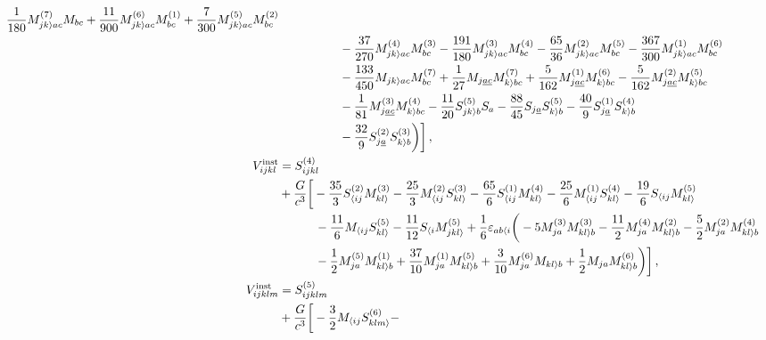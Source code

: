\documentclass[prd,preprint,superscriptaddress,tightenlines,nofootinbib,
  eqsecnum,showpacs]{revtex4}
\begin{document}
\begin{subequations}
\begin{align}
  \frac{1}{180} M_{jk \rangle ac}^{(7)} M_{bc} + \frac{11}{900} M_{jk
    \rangle ac}^{(6)} M_{bc}^{(1)} + \frac{7}{300} M_{jk \rangle
    ac}^{(5)} M_{bc}^{(2)} \nonumber \\ & \quad\qquad\qquad -
  \frac{37}{270} M_{jk \rangle ac}^{(4)} M_{bc}^{(3)} -
  \frac{191}{180} M_{jk \rangle ac}^{(3)} M_{bc}^{(4)} - \frac{65}{36}
  M_{jk \rangle ac}^{(2)} M_{bc}^{(5)} - \frac{367}{300} M_{jk \rangle
    ac}^{(1)} M_{bc}^{(6)} \nonumber \\ & \quad\qquad\qquad -
  \frac{133}{450} M_{jk \rangle ac} M_{bc}^{(7)} + \frac{1}{27} M_{j
    \underline{ac}} M_{k \rangle bc}^{(7)} + \frac{5}{162}
  M_{j\underline{ac}}^{(1)} M_{k \rangle bc}^{(6)} - \frac{5}{162}
  M_{j\underline{ac}}^{(2)} M_{k \rangle bc}^{(5)} \nonumber \\ &
  \nonumber \quad\qquad\qquad - \frac{1}{81} M_{j\underline{ac}}^{(3)}
  M_{k \rangle bc}^{(4)} - \frac{11}{20} S_{jk \rangle b}^{(5)} S_a -
  \frac{88}{45} S_{j \underline{a}} S_{k \rangle b}^{(5)} -
  \frac{40}{9} S_{j\underline{a}}^{(1)} S_{k \rangle b}^{(4)}
  \nonumber \\ & \nonumber \quad\qquad\qquad - \frac{32}{9}
  S_{j\underline{a}}^{(2)} S_{k \rangle b}^{(3)} \bigg)\bigg] \,,\\
V_{ijkl}^\text{inst} &= S^{(4)}_{ijkl} \nonumber \\ &+ {G\over
  c^3}\bigg[- {35\over3}S^{(2)}_{\langle
    ij}M^{(3)}_{kl\rangle}-{25\over3}M^{(2)}_{\langle
    ij}S^{(3)}_{kl\rangle} -{65\over6}S^{(1)}_{\langle
    ij}M^{(4)}_{kl\rangle}-{25\over6}M^{(1)}_{\langle
    ij}S^{(4)}_{kl\rangle} -{19\over6}S_{\langle
    ij}M^{(5)}_{kl\rangle}\nonumber\\ & \quad\qquad
  -{11\over6}M_{\langle ij}S^{(5)}_{kl\rangle}-{11\over12}S_{\langle
    i}M^{(5)}_{jkl\rangle} +{1\over6}\varepsilon_{ab\langle
    i}\bigg(-5M^{(3)}_{ja}M^{(3)}_{kl\rangle b}
  -{11\over2}M^{(4)}_{ja}M^{(2)}_{kl\rangle b}
  -{5\over2}M^{(2)}_{ja}M^{(4)}_{kl\rangle b}\nonumber\\ & \quad\qquad
  -{1\over2}M^{(5)}_{ja}M^{(1)}_{kl\rangle b}
  +{37\over10}M^{(1)}_{ja}M^{(5)}_{kl\rangle b}
  +{3\over10}M^{(6)}_{ja}M_{kl\rangle
    b}+{1\over2}M_{ja}M^{(6)}_{kl\rangle b}\bigg)\bigg] \,,\\
V_{ijklm}^\text{inst} &= S^{(5)}_{ijklm} \nonumber \\ &+ \frac{G}{c^3}
\bigg[- \frac{3}{2} M_{\langle ij} S_{klm \rangle}^{(6)} -

\end{align}
\end{subequations}
\end{document}
